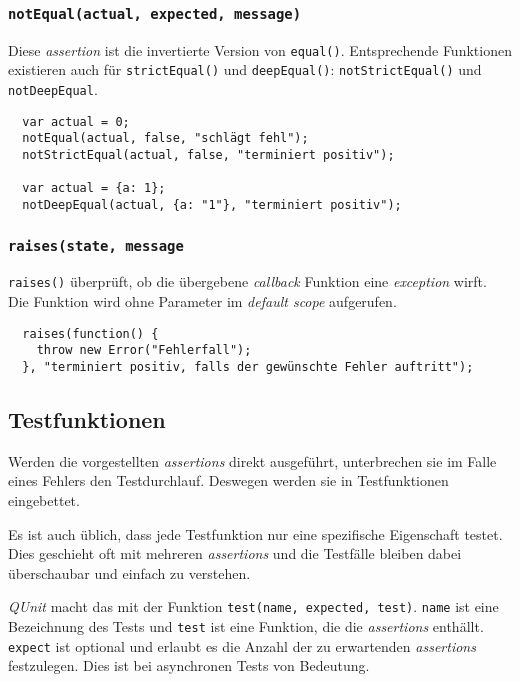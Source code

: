 \documentclass[11pt, a4paper]{article}
\begin{document}
\subsubsection*{\texttt{notEqual(actual, expected, message)}}

Diese \emph{assertion} ist die invertierte Version von \texttt{equal()}.
Entsprechende Funktionen existieren auch für \texttt{strictEqual()} und
\texttt{deepEqual()}: \texttt{notStrictEqual()} und \texttt{notDeepEqual}.

\begin{verbatim}
  var actual = 0;
  notEqual(actual, false, "schlägt fehl");
  notStrictEqual(actual, false, "terminiert positiv");

  var actual = {a: 1};
  notDeepEqual(actual, {a: "1"}, "terminiert positiv");
\end{verbatim}

\subsubsection*{\texttt{raises(state, message}}

\texttt{raises()} überprüft, ob die übergebene \emph{callback} Funktion eine
\emph{exception} wirft. Die Funktion wird ohne Parameter im \emph{default scope}
aufgerufen.

\begin{verbatim}
  raises(function() {
    throw new Error("Fehlerfall");
  }, "terminiert positiv, falls der gewünschte Fehler auftritt");
\end{verbatim}

\subsection{Testfunktionen}

Werden die vorgestellten \emph{assertions} direkt ausgeführt, unterbrechen sie
im Falle eines Fehlers den Testdurchlauf. Deswegen werden sie in Testfunktionen
eingebettet.

Es ist auch üblich, dass jede Testfunktion nur eine spezifische Eigenschaft
testet. Dies geschieht oft mit mehreren \emph{assertions} und die Testfälle
bleiben dabei überschaubar und einfach zu verstehen.

\emph{QUnit} macht das mit der Funktion \texttt{test(name, expected, test)}.
\texttt{name} ist eine Bezeichnung des Tests und \texttt{test} ist eine
Funktion, die die \emph{assertions} enthällt. \texttt{expect} ist optional und
erlaubt es die Anzahl der zu erwartenden \emph{assertions} festzulegen. Dies ist
bei asynchronen Tests von Bedeutung.
\end{document}
